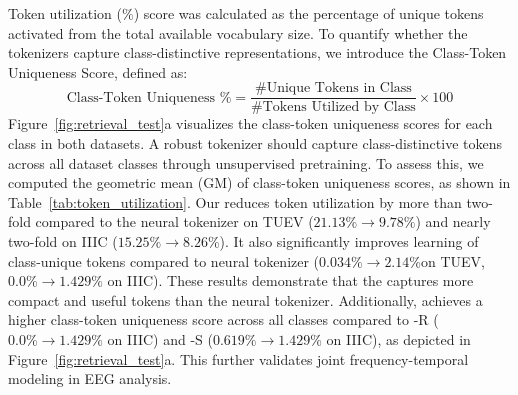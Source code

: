  Token utilization ($\%$) score was calculated as the percentage of unique tokens activated from the total available vocabulary size. To quantify whether the tokenizers capture class-distinctive representations, we introduce the Class-Token Uniqueness Score, defined as:
$$
\text{Class-Token Uniqueness \%} = \frac{\text{\# Unique Tokens in Class} }{\text{\# Tokens Utilized by Class}}\times 100 %
$$
Figure~\ref{fig:retrieval_test}a visualizes the class-token uniqueness scores for each class in both datasets. A robust tokenizer should capture class-distinctive tokens across all dataset classes through unsupervised pretraining. To assess this, we computed the geometric mean (GM) of class-token uniqueness scores, as shown in Table~\ref{tab:token_utilization}. Our \tokenizer reduces token utilization by more than two-fold compared to the neural tokenizer on TUEV ($21.13\% \rightarrow 9.78\%$) and nearly two-fold on IIIC ($15.25\% \rightarrow 8.26\%$). 
It also significantly improves learning of class-unique tokens compared to neural tokenizer ($0.034\% \rightarrow 2.14\%$on TUEV, $0.0\% \rightarrow 1.429\%$ on IIIC). These results demonstrate that the \tokenizer captures more compact and useful tokens than the neural tokenizer. Additionally, \tokenizer achieves a higher class-token uniqueness score across all classes compared to \tokenizer-R ($0.0\% \rightarrow 1.429\%$ on IIIC) and \tokenizer-S  ($0.619\% \rightarrow 1.429\%$ on IIIC), as depicted in Figure~\ref{fig:retrieval_test}a. This further validates joint frequency-temporal modeling in EEG analysis.








